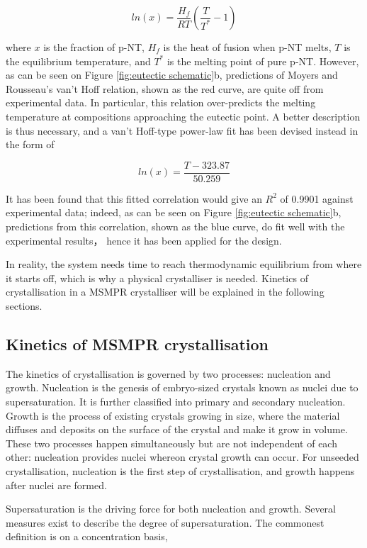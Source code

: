 \begin{equation}
    ln(x) = \frac{H_f}{R T}(\frac{T}{T^*} - 1)
\end{equation}

\noindent where $x$ is the fraction of p-NT, $H_f$ is the heat of fusion when p-NT melts, $T$ is the equilibrium temperature, and $T^*$ is the melting point of pure p-NT. However, as can be seen on Figure \ref{fig:eutectic schematic}b, predictions of Moyers and Rousseau's van't Hoff relation, shown as the red curve, are quite off from experimental data. In particular, this relation over-predicts the melting temperature at compositions approaching the eutectic point. A better description is thus necessary, and a van't Hoff-type power-law fit has been devised instead in the form of 

\begin{equation}
     ln(x) = \frac{T - 323.87}{50.259}
\end{equation}

\noindent It has been found that this fitted correlation would give an $R^2$ of 0.9901 against experimental data; indeed, as can be seen on Figure \ref{fig:eutectic schematic}b, predictions from this correlation, shown as the blue curve, do fit well with the experimental results， hence it has been applied for the design.

In reality, the system needs time to reach thermodynamic equilibrium from where it starts off, which is why a physical crystalliser is needed. Kinetics of crystallisation in a MSMPR crystalliser will be explained in the following sections.

\subsection{Kinetics of MSMPR crystallisation}
The kinetics of crystallisation is governed by two processes: nucleation and growth. Nucleation is the genesis of embryo-sized crystals known as nuclei due to supersaturation. \cite{richardson} It is further classified into primary and secondary nucleation. Growth is the process of existing crystals growing in size, where the material diffuses and deposits on the surface of the crystal and make it grow in volume. These two processes happen simultaneously but are not independent of each other: nucleation provides nuclei whereon crystal growth can occur. For unseeded crystallisation, nucleation is the first step of crystallisation, and growth happens after nuclei are formed. 

Supersaturation is the driving force for both nucleation and growth. Several measures exist to describe the degree of supersaturation. The commonest definition is on a concentration basis,

